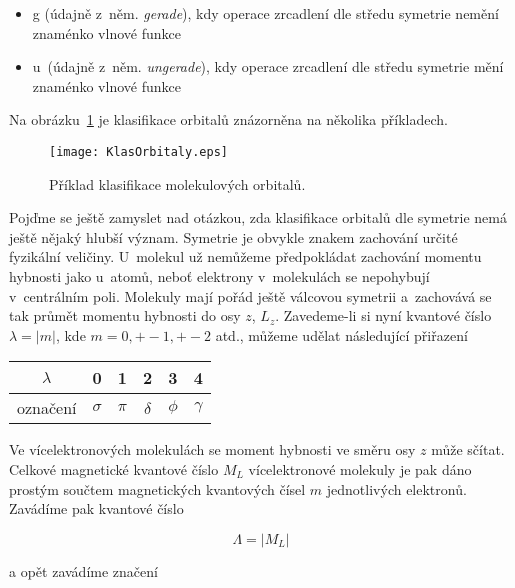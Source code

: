 \begin{itemize}

\item g (údajně z~něm. \textit{gerade}), kdy operace zrcadlení dle středu symetrie nemění znaménko vlnové funkce

\item u~(údajně z~něm. \textit{ungerade}), kdy operace zrcadlení dle středu symetrie mění znaménko vlnové funkce 

\end{itemize}

Na obrázku~\ref{obr:KlasifikaceMO} je klasifikace orbitalů znázorněna na několika příkladech.

\begin{figure} [htb]
\centering
\texttt{[image: KlasOrbitaly.eps]}
\caption[Klasifikace MO]{Příklad klasifikace molekulových orbitalů.}
\label{obr:KlasifikaceMO}
\end{figure}
 

Pojďme se ještě zamyslet nad otázkou, zda klasifikace orbitalů dle symetrie nemá ještě nějaký hlubší význam. Symetrie je obvykle znakem zachování určité fyzikální veličiny. U~molekul už nemůžeme předpokládat zachování momentu hybnosti jako u~atomů, neboť elektrony v~molekulách se nepohybují v~centrálním poli. Molekuly mají pořád ještě válcovou symetrii a~zachovává se tak průmět momentu hybnosti do osy $z$, $L_z$. Zavedeme-li si nyní kvantové číslo $\lambda= |m|$, kde $m=0,+-1,+-2$ atd., můžeme udělat následující přiřazení


\begin{table} [htb]
\centering
\begin{tabular}{c|c|c|c|c|c}
\toprule
$\lambda$ & 0 & 1 & 2 & 3 & 4\\
\midrule
označení & $\sigma$ & $\pi$ & $\delta$ & $\phi$ & $\gamma$\\
\bottomrule
\end{tabular}
\end{table}


Ve vícelektronových molekulách se moment hybnosti ve směru osy $z$ může sčítat. Celkové magnetické kvantové číslo $M_L$ vícelektronové molekuly je pak dáno prostým součtem magnetických kvantových čísel $m$ jednotlivých elektronů. Zavádíme pak kvantové číslo 

\begin{equation}
\Lambda = \vert M_L \vert
\label{rov:ElStrukt-24}
\end{equation}   
      
\noindent a opět zavádíme značení


